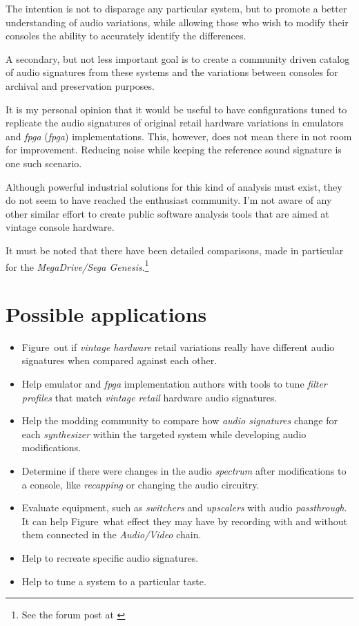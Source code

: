 \documentclass[10pt,a4paper]{report}
\newcommand{\define}[1]{\textit{\acrlong{#1}} (\textit{\acrshort{#1}})}
\newcommand{\ac}[1]{\textit{\mbox{\acrshort{#1}}}}
\begin{document}
The intention is not to disparage any particular system, but to promote a better understanding of audio variations, while allowing those who wish to modify their consoles the ability to accurately identify the differences.

A secondary, but not less important goal is to create a community driven catalog of audio signatures from these systems and the variations between consoles for archival and preservation purposes.

It is my personal opinion that it would be useful to have configurations tuned to replicate the audio signatures of original retail hardware variations in emulators and \define{fpga} implementations. This, however, does not mean there in not room for improvement. Reducing noise while keeping the reference sound signature is one such scenario.

Although powerful industrial solutions for this kind of analysis must exist, they do not seem to have reached the enthusiast community. I'm not aware of any other similar effort to create public software analysis tools that are aimed at vintage console hardware.

It must be noted that there have been detailed comparisons, made in particular for the \textit{MegaDrive/Sega Genesis}.\footnote{See the forum post at \cite{genesisaudio}}

\section{Possible applications}

\begin{itemize}
	\item Figure~out if \textit{vintage hardware} retail variations really have different audio signatures when compared against each other.
	\item Help emulator and \ac{fpga} implementation authors with tools to tune \textit{filter profiles} that match \textit{vintage retail} hardware audio signatures.
	\item Help the modding community to compare how \textit{audio signatures} change for each \textit{synthesizer} within the targeted system while developing audio modifications.
	\item Determine if there were changes in the audio \textit{spectrum} after modifications to a console, like \textit{recapping} or changing the audio circuitry.
	\item Evaluate equipment, such as \textit{switchers} and \textit{upscalers} with audio \textit{passthrough}. It can help Figure~what effect they may have by recording with and without them connected in the \textit{Audio/Video} chain.
	\item Help to recreate specific audio signatures.
	\item Help to tune a system to a particular taste.
\end{itemize}
\end{document}
